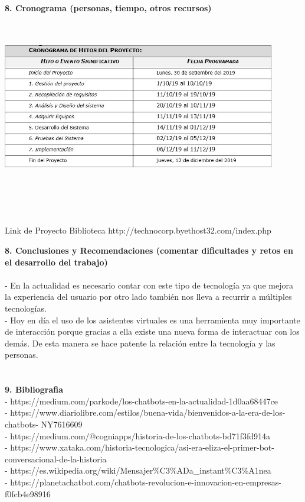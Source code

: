 \begin{flushleft}
\begin{itemize}
\textbf{ }\\
\textbf{8.      Cronograma (personas, tiempo, otros recursos) }\\
\textbf{ }\\

\textbf{ }\\
\begin{center}
	\includegraphics[width=12cm]{./Imagenes/cronograma} 
	\end{center}
\textbf{ }\\
\textbf{ }\\
\textbf{ }\\

\textbf{ }\\
Link de Proyecto Biblioteca
http://technocorp.byethost32.com/index.php

\textbf{8.  Conclusiones y Recomendaciones (comentar dificultades y retos en el desarrollo del trabajo)}\\
\textbf{ }\\
-	En la actualidad es necesario contar con este tipo de tecnología ya que mejora la experiencia del usuario por otro lado también nos lleva a recurrir a múltiples tecnologías.\textbf{ }\\
-	Hoy en día el uso de los asistentes virtuales es una herramienta muy importante de interacción porque gracias a ella existe una nueva forma de interactuar con los demás. De esta manera se hace patente la relación entre la tecnología y las personas.\textbf{ }\\
\textbf{ }\\
\textbf{ }\\
\textbf{9. Bibliografia}\\

- https://medium.com/parkode/los-chatbots-en-la-actualidad-1d0aa68447ce\\
- https://www.diariolibre.com/estilos/buena-vida/bienvenidos-a-la-era-de-los-chatbots- NY7616609\\
- https://medium.com/@cogniapps/historia-de-los-chatbots-bd71f3fd914a\\
- https://www.xataka.com/historia-tecnologica/asi-era-eliza-el-primer-bot- conversacional-de-la-historia\\
- https://es.wikipedia.org/wiki/Mensajer\%C3\%ADa\_instant\%C3\%A1nea\\
- https://planetachatbot.com/chatbots-revolucion-e-innovacion-en-empresas- f0fcb4e98916\\

\end{itemize} 


\end{flushleft}
